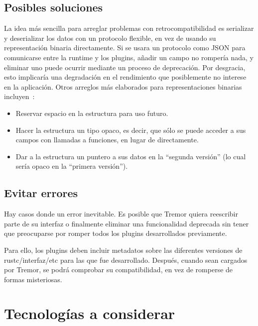 \subsection{Posibles soluciones}

La idea más sencilla para arreglar problemas con retrocompatibilidad es
serializar y deserializar los datos con un protocolo flexible, en vez de usando
su representación binaria directamente. Si se usara un protocolo como JSON para
comunicarse entre la runtime y los plugins, añadir un campo no rompería nada, y
eliminar uno puede ocurrir mediante un proceso de deprecación. Por desgracia,
esto implicaría una degradación en el rendimiento que posiblemente no interese
en la aplicación. Otros arreglos más elaborados para representaciones binarias
incluyen~\cite{swiftabi}:

\begin{itemize}
    \item Reservar espacio en la estructura para uso futuro.

    \item Hacer la estructura un tipo opaco, es decir, que sólo se puede acceder
        a sus campos con llamadas a funciones, en lugar de directamente.

    \item Dar a la estructura un puntero a sus datos en la ``segunda versión''
        (lo cual sería opaco en la ``primera versión'').

\end{itemize}

\subsection{Evitar errores}

Hay casos donde un error inevitable. Es posible que Tremor quiera reescribir
parte de su interfaz o finalmente eliminar una funcionalidad deprecada sin tener
que preocuparse por romper todos los plugins desarrollados previamente.

Para ello, los plugins deben incluir metadatos sobre las diferentes versiones
de rustc/interfaz/etc para las que fue desarrollado. Después, cuando sean
cargados por Tremor, se podrá comprobar su compatibilidad, en vez de romperse de
formas misteriosas.

\section{Tecnologías a considerar}

